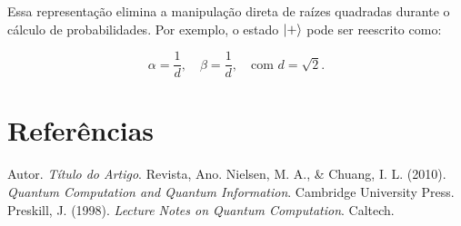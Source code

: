 \documentclass[12pt, a4paper]{article}
\begin{document}
Essa representação elimina a manipulação direta de raízes quadradas durante o cálculo de probabilidades. Por exemplo, o estado \(\ket{+}\) pode ser reescrito como:

\begin{equation}
\alpha = \frac{1}{d}, \quad \beta = \frac{1}{d}, \quad \text{com } d = \sqrt{2}.
\label{eq:exemplo}
\end{equation}

\section*{Referências}
\begin{thebibliography}{9}
 Autor. \textit{Título do Artigo}. Revista, Ano.
 Nielsen, M. A., \& Chuang, I. L. (2010). \textit{Quantum Computation and Quantum Information}. Cambridge University Press.
 Preskill, J. (1998). \textit{Lecture Notes on Quantum Computation}. Caltech.
\end{thebibliography}
\end{document}
